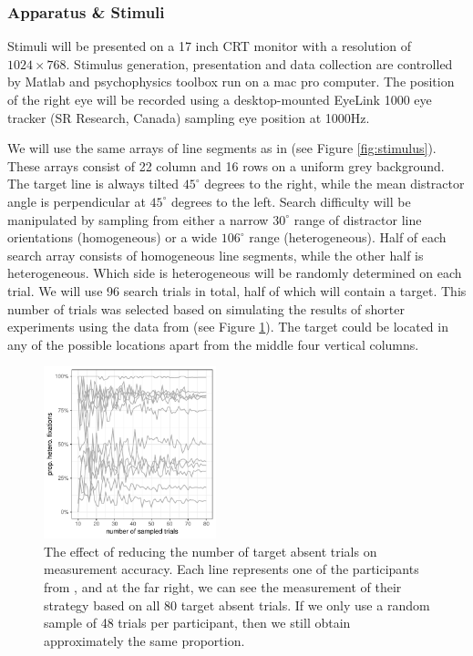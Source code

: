 \documentclass[]{rsos}
\begin{document}
\subsubsection{Apparatus \& Stimuli}

Stimuli will be presented on a 17 inch CRT monitor with a resolution of $1024 \times 768$. Stimulus generation, presentation and data collection are controlled by Matlab and psychophysics toolbox \cite{brainard1997,cornelissen2002} run on a mac pro computer. The position of the right eye will be recorded using a desktop-mounted EyeLink 1000 eye tracker (SR Research, Canada) sampling eye position at 1000Hz. 

We will use the same arrays of line segments as in \cite{nowakowska2017} (see Figure \ref{fig:stimulus}). These arrays consist of 22 column and 16 rows on a uniform grey background. The target line is always tilted $45^{\circ}$ degrees to the right, while the mean distractor angle is perpendicular at $45^{\circ}$ degrees to the left. Search difficulty will be manipulated by sampling from either a narrow $30^{\circ}$ range of distractor line orientations (homogeneous) or a wide $106^{\circ}$ range (heterogeneous). Half of each search array consists of homogeneous line segments, while the other half is heterogeneous. Which side is heterogeneous will be randomly determined on each trial. We will use 96 search trials in total, half of which will contain a target. This number of trials was selected based on simulating the results of shorter experiments using the data from \cite{nowakowska2017} (see Figure \ref{fig:num_trials}). The target could be located in any of the possible locations apart from the middle four vertical columns.

\begin{figure}
\centering
 \includegraphics[width=5cm]{Figures/using_smaller_sample_sizes.pdf}
\caption{The effect of reducing the number of target absent trials on measurement accuracy. Each line represents one of the participants from \cite{nowakowska2017}, and at the far right, we can see the measurement of their strategy based on all 80 target absent trials. If we only use a random sample of 48 trials per participant, then we still obtain approximately the same proportion.}
\label{fig:num_trials}
\end{figure}
\end{document}
